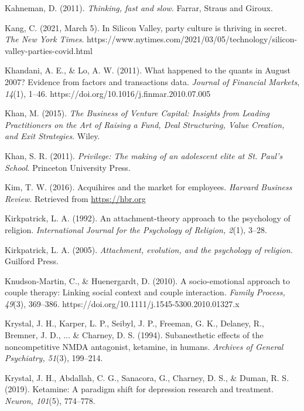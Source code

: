 \begin{thebibliography}{}
    
    Kahneman, D. (2011). \textit{Thinking, fast and slow}. Farrar, Straus and Giroux.

    Kang, C. (2021, March 5). In Silicon Valley, party culture is thriving in secret. \textit{The New York Times}. https://www.nytimes.com/2021/03/05/technology/silicon-valley-parties-covid.html

    Khandani, A. E., \& Lo, A. W. (2011). What happened to the quants in August 2007? Evidence from factors and transactions data. \textit{Journal of Financial Markets}, \textit{14}(1), 1–46. https://doi.org/10.1016/j.finmar.2010.07.005
    
    Khan, M. (2015). \textit{The Business of Venture Capital: Insights from Leading Practitioners on the Art of Raising a Fund, Deal Structuring, Value Creation, and Exit Strategies}. Wiley.

    Khan, S. R. (2011). \textit{Privilege: The making of an adolescent elite at St. Paul's School}. Princeton University Press.

    Kim, T. W. (2016). Acquihires and the market for employees. \textit{Harvard Business Review}. Retrieved from \url{https://hbr.org}

    Kirkpatrick, L. A. (1992). An attachment-theory approach to the psychology of religion. \textit{International Journal for the Psychology of Religion, 2}(1), 3–28.

    Kirkpatrick, L. A. (2005). \textit{Attachment, evolution, and the psychology of religion}. Guilford Press.

    Knudson-Martin, C., \& Huenergardt, D. (2010). A socio-emotional approach to couple therapy: Linking social context and couple interaction. \textit{Family Process, 49}(3), 369–386. https://doi.org/10.1111/j.1545-5300.2010.01327.x

    Krystal, J. H., Karper, L. P., Seibyl, J. P., Freeman, G. K., Delaney, R., Bremner, J. D., ... \& Charney, D. S. (1994). Subanesthetic effects of the noncompetitive NMDA antagonist, ketamine, in humans. \textit{Archives of General Psychiatry, 51}(3), 199–214.

    Krystal, J. H., Abdallah, C. G., Sanacora, G., Charney, D. S., \& Duman, R. S. (2019). Ketamine: A paradigm shift for depression research and treatment. \textit{Neuron, 101}(5), 774–778.


\end{thebibliography}
